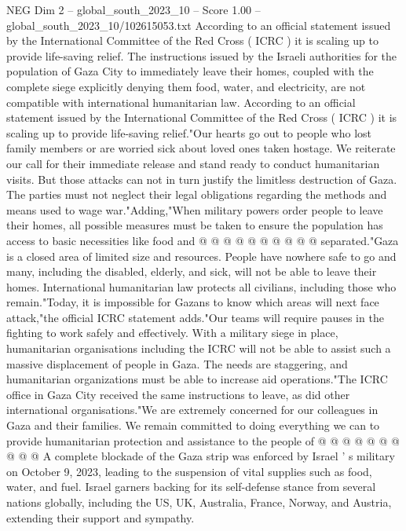 \begin{textsample}{NEG Dim 2 – global\_south\_2023\_10 – Score 1.00 – global\_south\_2023\_10/102615053.txt}  \label{ex:f2_neg_388}
According to an official statement issued by the International Committee of the Red Cross ( ICRC ) it is scaling up to provide life-saving relief.
The instructions issued by the Israeli authorities for the population of Gaza City to immediately leave their homes, coupled with the complete siege explicitly denying them food, water, and electricity, are not compatible with international humanitarian law.
According to an official statement issued by the International Committee of the Red Cross ( ICRC ) it is scaling up to provide life-saving relief."Our hearts go out to people who lost family members or are worried sick about loved ones taken hostage.
We reiterate our call for their immediate release and stand ready to conduct humanitarian visits.
But those attacks can not in turn justify the limitless destruction of Gaza.
The parties must not neglect their legal obligations regarding the methods and means used to wage war."Adding,"When military powers order people to leave their homes, all possible measures must be taken to ensure the population has access to basic necessities like food and @ @ @ @ @ @ @ @ @ @ separated."Gaza is a closed area of limited size and resources.
People have nowhere safe to go and many, including the disabled, elderly, and sick, will not be able to leave their homes.
International humanitarian law protects all civilians, including those who remain."Today, it is impossible for Gazans to know which areas will next face attack,"the official ICRC statement adds."Our teams will require pauses in the fighting to work safely and effectively.
With a military siege in place, humanitarian organisations including the ICRC will not be able to assist such a massive displacement of people in Gaza.
The needs are staggering, and humanitarian organizations must be able to increase aid operations."The ICRC office in Gaza City received the same instructions to leave, as did other international organisations."We are extremely concerned for our colleagues in Gaza and their families.
We remain committed to doing everything we can to provide humanitarian protection and assistance to the people of @ @ @ @ @ @ @ @ @ @ A complete blockade of the Gaza strip was enforced by Israel ' s military on October 9, 2023, leading to the suspension of vital supplies such as food, water, and fuel.
Israel garners backing for its self-defense stance from several nations globally, including the US, UK, Australia, France, Norway, and Austria, extending their support and sympathy.

\end{textsample}
